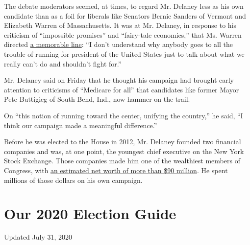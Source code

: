 The debate moderators seemed, at times, to regard Mr. Delaney less as
his own candidate than as a foil for liberals like Senators Bernie
Sanders of Vermont and Elizabeth Warren of Massachusetts. It was at Mr.
Delaney, in response to his criticism of ``impossible promises'' and
``fairy-tale economics,'' that Ms. Warren directed
\href{https://www.nytimes.com/2019/07/30/us/politics/elizabeth-warren-debate.html}{a
memorable line}: ``I don't understand why anybody goes to all the
trouble of running for president of the United States just to talk about
what we really can't do and shouldn't fight for.''

Mr. Delaney said on Friday that he thought his campaign had brought
early attention to criticisms of ``Medicare for all'' that candidates
like former Mayor Pete Buttigieg of South Bend, Ind., now hammer on the
trail.

On ``this notion of running toward the center, unifying the country,''
he said, ``I think our campaign made a meaningful difference.''

Before he was elected to the House in 2012, Mr. Delaney founded two
financial companies and was, at one point, the youngest chief executive
on the New York Stock Exchange. Those companies made him one of the
wealthiest members of Congress, with
\href{https://www.rollcall.com/news/politics/every-member-congress-wealth-one-chart}{an
estimated net worth of more than \$90 million}. He spent millions of
those dollars on his own campaign.

\hypertarget{our-2020-election-guide}{%
\section{Our 2020 Election Guide}\label{our-2020-election-guide}}

Updated July 31, 2020

